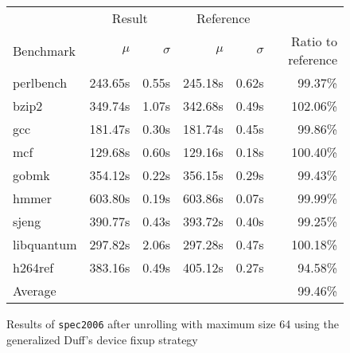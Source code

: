 \begin{figure}[th]
    \begin{center}
        \begin{tabular}{lrrrrr}
            \toprule
            & \multicolumn{2}{c}{Result} & \multicolumn{2}{c}{Reference}\\
            Benchmark & $\mu$ & $\sigma$ & $\mu$ & $\sigma$ & Ratio to reference\\
            \midrule
            perlbench & 243.65s & 0.55s & 245.18s & 0.62s & 99.37\%\\
            bzip2 & 349.74s & 1.07s & 342.68s & 0.49s & 102.06\%\\
            gcc & 181.47s & 0.30s & 181.74s & 0.45s & 99.86\%\\
            mcf & 129.68s & 0.60s & 129.16s & 0.18s & 100.40\%\\
            gobmk & 354.12s & 0.22s & 356.15s & 0.29s & 99.43\%\\
            hmmer & 603.80s & 0.19s & 603.86s & 0.07s & 99.99\%\\
            sjeng & 390.77s & 0.43s & 393.72s & 0.40s & 99.25\%\\
            libquantum & 297.82s & 2.06s & 297.28s & 0.47s & 100.18\%\\
            h264ref & 383.16s & 0.49s & 405.12s & 0.27s & 94.58\%\\
            \midrule
            Average & & & & & 99.46\%\\
            \bottomrule
        \end{tabular}
    \end{center}
    \caption{Results of \texttt{spec2006} after unrolling with maximum size 64 using the generalized Duff's device fixup strategy}
    \label{fig:eval:perf:duff:64}
\end{figure}
